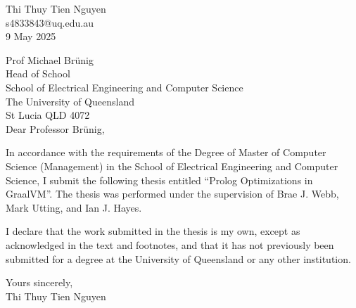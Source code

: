 \begin{flushright}
Thi Thuy Tien Nguyen \\
s4833843@uq.edu.au \\
9 May 2025
\end{flushright}

Prof Michael Brünig \\
Head of School \\
School of Electrical Engineering and Computer Science \\
The University of Queensland \\
St Lucia  QLD  4072 \\

Dear Professor Brünig, \\

\par
\hspace*{2em} In accordance with the requirements of the Degree of Master of Computer Science (Management) in the School of Electrical Engineering and Computer Science, I submit the following thesis entitled
“Prolog Optimizations in GraalVM”. The thesis was performed under the supervision of Brae J. Webb, Mark Utting, and Ian J. Hayes. \\
\par
\hspace*{2em} I declare that the work submitted in the thesis is my own, except as acknowledged in the text and footnotes, and that it has not previously been submitted for a degree at the University of Queensland or any other institution.

\begin{flushright}
Yours sincerely, \\
Thi Thuy Tien Nguyen \\
\end{flushright}
